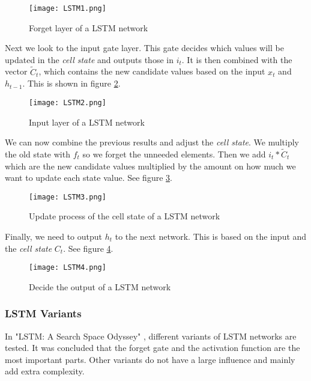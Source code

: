 \begin{figure}[!htb]
	\centering
	\texttt{[image: LSTM1.png]}
	\caption{Forget layer of a LSTM network \cite{lstmGood:online}}
	\label{fig:LSTM1}
\end{figure} 

Next we look to the input gate layer. This gate decides which values will be updated in the \textit{cell state} and outputs those in $i_t$. It is then combined with the vector $\widetilde{C}_t$, which contains the new candidate values based on the input $x_t$ and $h_{t-1}$. This is shown in figure \ref{fig:LSTM2}. \\

\begin{figure}[!htb]
	\centering
	\texttt{[image: LSTM2.png]}
	\caption{Input layer of a LSTM network \cite{lstmGood:online}}
	\label{fig:LSTM2}
\end{figure} 

We can now combine the previous results and adjust the \textit{cell state}. We multiply the old state with $f_t$ so we forget the unneeded elements. Then we add $i_t*\widetilde{C}_t$ which are the new candidate values multiplied by the amount on how much we want to update each state value. See figure \ref{fig:LSTM3}. \\

\begin{figure}[!htb]
	\centering
	\texttt{[image: LSTM3.png]}
	\caption{Update process of the cell state of a LSTM network \cite{lstmGood:online}}
	\label{fig:LSTM3}
\end{figure} 

Finally, we need to output $h_t$ to the next network. This is based on the input and the \textit{cell state} $C_t$. See figure \ref{fig:LSTM4}. \\

\begin{figure}[!htb]
	\centering
	\texttt{[image: LSTM4.png]}
	\caption{Decide the output of a LSTM network \cite{lstmGood:online}}
	\label{fig:LSTM4}
\end{figure} 


\subsubsection{LSTM Variants}

In "LSTM: A Search Space Odyssey" \cite{lstmSpace:article}, different variants of LSTM networks are tested. It was concluded that the forget gate and the activation function are the most important parts. Other variants do not have a large influence and mainly add extra complexity.


